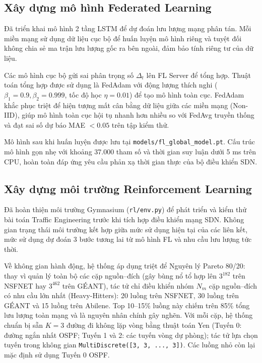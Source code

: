 \documentclass[11pt,a4paper]{article}
\begin{document}
\subsection{Xây dựng mô hình Federated Learning}
Đã triển khai mô hình 2 tầng LSTM để dự đoán lưu lượng mạng phân tán. Mỗi miền mạng sử dụng dữ liệu cục bộ để huấn luyện mô hình riêng và tuyệt đối không chia sẻ ma trận lưu lượng gốc ra bên ngoài, đảm bảo tính riêng tư của dữ liệu.

Các mô hình cục bộ gửi sai phân trọng số $\Delta_t$ lên FL Server để tổng hợp. Thuật toán tổng hợp được sử dụng là FedAdam với động lượng thích nghi ($\beta_1 = 0.9, \beta_2 = 0.999$, tốc độ học $\eta = 0.01$) để tạo mô hình toàn cục. FedAdam khắc phục triệt để hiện tượng mất cân bằng dữ liệu giữa các miền mạng (Non-IID), giúp mô hình toàn cục hội tụ nhanh hơn nhiều so với FedAvg truyền thống và đạt sai số dự báo MAE $< 0.05$ trên tập kiểm thử.

Mô hình sau khi huấn luyện được lưu tại \texttt{models/fl\_global\_model.pt}. Cấu trúc mô hình gọn nhẹ với khoảng 37.000 tham số và thời gian suy luận dưới 5 ms trên CPU, hoàn toàn đáp ứng yêu cầu phản xạ thời gian thực của bộ điều khiển SDN.

\subsection{Xây dựng môi trường Reinforcement Learning}
Đã hoàn thiện môi trường Gymnasium (\texttt{rl/env.py}) để phát triển và kiểm thử bài toán Traffic Engineering trước khi tích hợp điều khiển mạng SDN. Không gian trạng thái môi trường kết hợp giữa mức sử dụng hiện tại của các liên kết, mức sử dụng dự đoán 3 bước tương lai từ mô hình FL và nhu cầu lưu lượng tức thời.

Về không gian hành động, hệ thống áp dụng triệt để Nguyên lý Pareto 80/20: thay vì quản lý toàn bộ các cặp nguồn–đích (gây bùng nổ tổ hợp lên $3^{182}$ trên NSFNET hay $3^{462}$ trên GÉANT), tác tử chỉ điều khiển nhóm $N_m$ cặp nguồn–đích có nhu cầu lớn nhất (Heavy-Hitters): 20 luồng trên NSFNET, 30 luồng trên GÉANT và 15 luồng trên Abilene. Top 10–15\% luồng này chiếm trên 85\% tổng lưu lượng toàn mạng và là nguyên nhân chính gây nghẽn. Với mỗi cặp, hệ thống chuẩn bị sẵn $K = 3$ đường đi không lặp vòng bằng thuật toán Yen (Tuyến 0: đường ngắn nhất OSPF; Tuyến 1 và 2: các tuyến vòng dự phòng); tác tử lựa chọn tuyến trong không gian \texttt{MultiDiscrete([3, 3, ..., 3])}. Các luồng nhỏ còn lại mặc định sử dụng Tuyến 0 OSPF.
\end{document}
